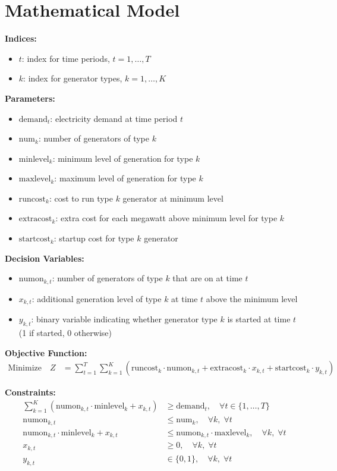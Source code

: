 \documentclass{article}
\begin{document}
\section*{Mathematical Model}

\textbf{Indices:}
\begin{itemize}
    \item \( t \): index for time periods, \( t = 1, \ldots, T \)
    \item \( k \): index for generator types, \( k = 1, \ldots, K \)
\end{itemize}

\textbf{Parameters:}
\begin{itemize}
    \item \( \text{demand}_t \): electricity demand at time period \( t \)
    \item \( \text{num}_k \): number of generators of type \( k \)
    \item \( \text{minlevel}_k \): minimum level of generation for type \( k \)
    \item \( \text{maxlevel}_k \): maximum level of generation for type \( k \)
    \item \( \text{runcost}_k \): cost to run type \( k \) generator at minimum level
    \item \( \text{extracost}_k \): extra cost for each megawatt above minimum level for type \( k \)
    \item \( \text{startcost}_k \): startup cost for type \( k \) generator
\end{itemize}

\textbf{Decision Variables:}
\begin{itemize}
    \item \( \text{numon}_{k,t} \): number of generators of type \( k \) that are on at time \( t \)
    \item \( x_{k,t} \): additional generation level of type \( k \) at time \( t \) above the minimum level
    \item \( y_{k,t} \): binary variable indicating whether generator type \( k \) is started at time \( t \) (1 if started, 0 otherwise)
\end{itemize}

\textbf{Objective Function:}
\begin{align*}
\text{Minimize} \quad Z &= \sum_{t=1}^T \sum_{k=1}^K \left( \text{runcost}_k \cdot \text{numon}_{k,t} + \text{extracost}_k \cdot x_{k,t} + \text{startcost}_k \cdot y_{k,t} \right)
\end{align*}

\textbf{Constraints:}
\begin{align*}
\sum_{k=1}^K (\text{numon}_{k,t} \cdot \text{minlevel}_k + x_{k,t}) &\geq \text{demand}_t, \quad \forall t \in \{1, \ldots, T\} \\
\text{numon}_{k,t} &\leq \text{num}_k, \quad \forall k, \; \forall t \\
\text{numon}_{k,t} \cdot \text{minlevel}_k + x_{k,t} &\leq \text{numon}_{k,t} \cdot \text{maxlevel}_k, \quad \forall k, \; \forall t \\
x_{k,t} &\geq 0, \quad \forall k, \; \forall t \\
y_{k,t} &\in \{0, 1\}, \quad \forall k, \; \forall t
\end{align*}
\end{document}
